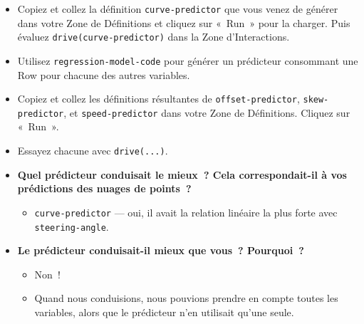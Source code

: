 \documentclass[12pt,a4paper]{article}
\begin{document}
\begin{activitybox}
  \begin{itemize}
    \item Copiez et collez la définition \texttt{curve-predictor} que vous venez de générer dans votre Zone de Définitions et cliquez sur «~Run~» pour la charger. Puis évaluez \texttt{drive(curve-predictor)} dans la Zone d'Interactions.
    \item Utilisez \texttt{regression-model-code} pour générer un prédicteur consommant une Row pour chacune des autres variables.
    \item Copiez et collez les définitions résultantes de \texttt{offset-predictor}, \texttt{skew-predictor}, et \texttt{speed-predictor} dans votre Zone de Définitions. Cliquez sur «~Run~».
    \item Essayez chacune avec \texttt{drive(...)}.
  \end{itemize}

  \begin{itemize}
    \item \textbf{Quel prédicteur conduisait le mieux~? Cela correspondait-il à vos prédictions des nuages de points~?}
    \begin{itemize}
      \item \texttt{curve-predictor} — oui, il avait la relation linéaire la plus forte avec \texttt{steering-angle}.
    \end{itemize}
    \item \textbf{Le prédicteur conduisait-il mieux que vous~? Pourquoi~?}
    \begin{itemize}
      \item Non~!
      \item Quand nous conduisions, nous pouvions prendre en compte toutes les variables, alors que le prédicteur n'en utilisait qu'une seule.
    \end{itemize}
  \end{itemize}
\end{activitybox}
\end{document}
